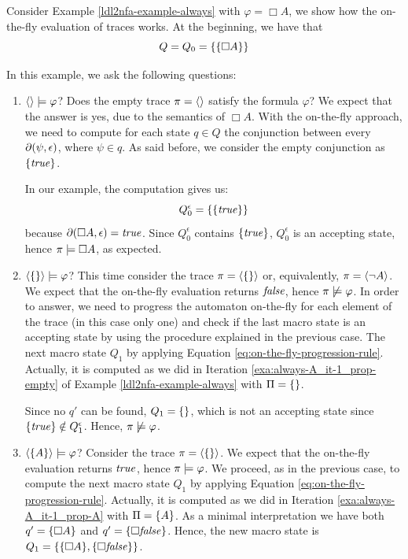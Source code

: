\begin{example}\label{exa:on-the-fly-always-A}
	Consider Example \ref{ldl2nfa-example-always} with $\varphi = \Box A$, we show how the on-the-fly evaluation of traces works.
	At the beginning, we have that $$Q = Q_0 = \{\{\Box A\}\}$$

	In this example, we ask the following questions:
	\begin{enumerate}
		\item $\langle  \rangle \models \varphi$? Does the empty trace $\pi = \langle  \rangle$ satisfy the formula $\varphi$? We expect that the answer is yes, due to the semantics of $\Box A$. With the on-the-fly approach, we need to compute for each \NFA state $q \in Q$ the conjunction between every $\partial\lparen \psi, \epsilon\rparen$, where $\psi \in q$. As said before, we consider the empty conjunction as $\{\mathit{true}\}$.
		
		In our example, the computation gives us:
		$$Q_0^\epsilon = \{\{\mathit{true}\}\}$$
		because $\partial\lparen \Box A, \epsilon\rparen = \mathit{true}$.
		Since $Q_0^\epsilon$ contains $\{\mathit{true}\}$, $Q_0^\epsilon$ is an accepting state, hence $\pi \models \Box A$, as expected.
		
		\item $\langle \{\} \rangle \models \varphi$? This time consider the trace $\pi = \langle \{\} \rangle$ or, equivalently, $\pi = \langle \lnot A \rangle$. We expect that the on-the-fly evaluation returns $\mathit{false}$, hence $\pi \not \models \varphi$. In order to answer, we need to progress the automaton on-the-fly for each element of the trace (in this case only one) and check if the last macro state is an accepting state by using the procedure explained in the previous case.
		The next macro state $Q_1$ by applying Equation \ref{eq:on-the-fly-progression-rule}. Actually, it is computed as we did in Iteration \ref{exa:always-A_it-1_prop-empty} of Example \ref{ldl2nfa-example-always} with $\Pi = \{\}$. 
		
		Since no $q'$ can be found, $Q_1 = \{\}$, which is not an accepting state since $\{\mathit{true}\} \notin Q_1^\epsilon$. Hence, $\pi \not \models \varphi$.\label{exa:on-the-fly-always-A-trace-false}
		
		\item \label{exa:on-the-fly-always-A-trace-A} $\langle \{A\} \rangle \models \varphi$? Consider the trace $\pi = \langle \{\} \rangle$. We expect that the on-the-fly evaluation returns $\mathit{true}$, hence $\pi \models \varphi$. We proceed, as in the previous case, to compute the next macro state $Q_1$ by applying Equation \ref{eq:on-the-fly-progression-rule}. Actually, it is computed as we did in Iteration \ref{exa:always-A_it-1_prop-A} with $\Pi = \{A\}$. As a minimal interpretation we have both $q' = \{\Box A\}$ and $q' = \{\Box \mathit{false}\}$. Hence, the new macro state is $Q_1 = \{\{\Box A\}, \{\Box \mathit{false}\}\}$.
		

\end{enumerate}
\end{example}
